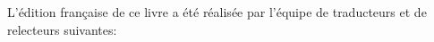\documentclass[a4paper,10pt,twoside]{book}
\begin{document}
L'édition française de ce livre a été réalisée par
l'équipe de traducteurs et de relecteurs suivantes: 


\ifx\wholebook\relax\else
   
   
\end{document}
